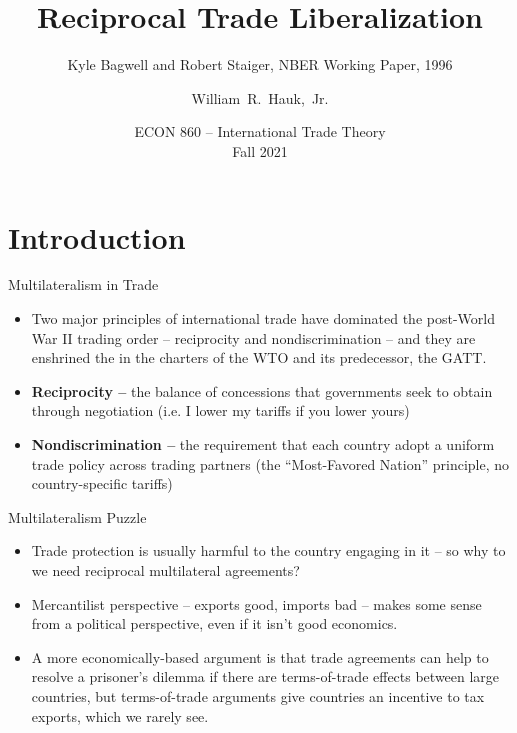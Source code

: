 \documentclass[aspectratio=169]{beamer}
\title[Bagwell and Staiger (1996)] %
{Reciprocal Trade Liberalization}
\subtitle{Kyle Bagwell and Robert Staiger, NBER Working Paper, 1996}
\author [Hauk] %
{William~R.~Hauk,~Jr.} %
\institute[UofSC] %
{
  Darla Moore School of Business\\
  University of South Carolina
}
\date[ECON 860, Fall 2021] %
{ECON 860 -- International Trade Theory\\Fall 2021}
\begin{document}
\frame{\titlepage}


\section{Introduction}


\begin{frame}{Multilateralism in Trade}

\begin{itemize}
    \item<1-> Two major principles of international trade have dominated the post-World War II trading order – reciprocity and nondiscrimination – and they are enshrined the in the charters of the WTO and its predecessor, the GATT.
    \item<2-> \textbf{Reciprocity --} the balance of concessions that governments seek to obtain through negotiation (i.e. I lower my tariffs if you lower yours)
    \item<3-> \textbf{Nondiscrimination --} the requirement that each country adopt a uniform trade policy across trading partners (the ``Most-Favored Nation” principle, no country-specific tariffs)
\end{itemize}
    
\end{frame}


\begin{frame}{Multilateralism Puzzle}

\begin{itemize}
    \item<1-> Trade protection is usually harmful to the country engaging in it – so why to we need reciprocal multilateral agreements?
    \item<2-> Mercantilist perspective – exports good, imports bad – makes some sense from a political perspective, even if it isn’t good economics.
    \item<3-> A more economically-based argument is that trade agreements can help to resolve a prisoner’s dilemma if there are terms-of-trade effects between large countries, but terms-of-trade arguments give countries an incentive to tax exports, which we rarely see.
\end{itemize}
    
\end{frame}
\end{document}
